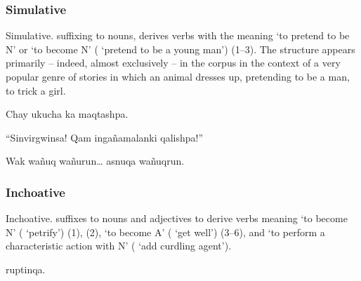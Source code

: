\subsubsection{Simulative }
Simulative. suffixing to nouns,  derives verbs with the meaning `to pretend to be N' or `to become N' ( `pretend to be a young man') (1--3). The structure appears primarily -- indeed, almost exclusively -- in the corpus in the context of a very popular genre of stories in which an animal dresses up, pretending to be a man, to trick a girl.

%
{Chay ukucha ka  maqtashpa.}%
{}%
{}{}%

%
{``\textexclamdown{}Sinvirgwinsa! \textexclamdown{}Qam inga\~namalanki qalishpa!''}%
{}%
{}{}%

%
{Wak wa\~nuq wa\~nurun\dots{} asnuqa wa\~nuqrun.}%
{}%
{}{}%

\subsubsection{Inchoative }\label{ssec:inchoative}
Inchoative.  suffixes to nouns and adjectives to derive verbs meaning `to become N' ( `petrify') (1), (2), `to become A' ( `get well') (3--6), and `to perform a characteristic action with N' ( `add curdling agent'). 

%
{ruptinqa.}%
{}%
{}{}%

